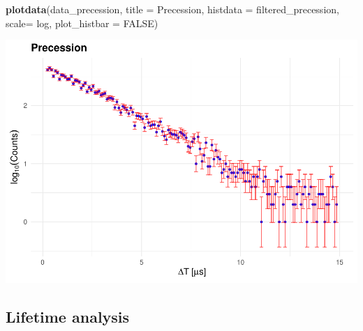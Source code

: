 \documentclass[
]{article}
\newenvironment{Shaded}{\begin{snugshade}}{\end{snugshade}}
\newcommand{\AttributeTok}[1]{\textcolor[rgb]{0.13,0.29,0.53}{#1}}
\newcommand{\ConstantTok}[1]{\textcolor[rgb]{0.56,0.35,0.01}{#1}}
\newcommand{\FunctionTok}[1]{\textcolor[rgb]{0.13,0.29,0.53}{\textbf{#1}}}
\newcommand{\NormalTok}[1]{#1}
\newcommand{\StringTok}[1]{\textcolor[rgb]{0.31,0.60,0.02}{#1}}
\begin{document}
\begin{Shaded}
\begin{Highlighting}[]
\FunctionTok{plotdata}\NormalTok{(data\_precession, }\AttributeTok{title =} \StringTok{\textquotesingle{}Precession\textquotesingle{}}\NormalTok{, }\AttributeTok{histdata =}\NormalTok{ filtered\_precession, }\AttributeTok{scale=}  \StringTok{\textquotesingle{}log\textquotesingle{}}\NormalTok{, }\AttributeTok{plot\_histbar =} \ConstantTok{FALSE}\NormalTok{)}
\end{Highlighting}
\end{Shaded}

\includegraphics{BinnedAnalysis_files/figure-latex/unnamed-chunk-4-2.pdf}

\subsection{Lifetime analysis}\label{lifetime-analysis}
\end{document}
